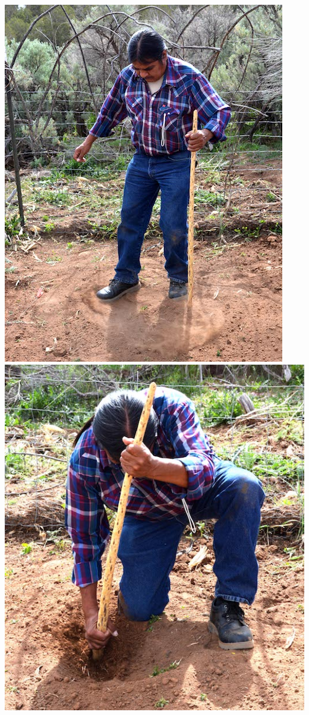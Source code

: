 \documentclass[12pt,]{article}
\begin{document}
\includegraphics{./images/planting/1_planting.jpg}
\includegraphics{./images/planting/2_planting.jpg}
\end{document}
